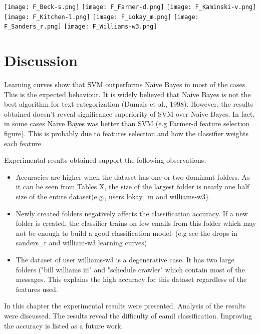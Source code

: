 \texttt{[image: F\_Beck-s.png]}
\texttt{[image: F\_Farmer-d.png]}
\texttt{[image: F\_Kaminski-v.png]}
\texttt{[image: F\_Kitchen-l.png]}
\texttt{[image: F\_Lokay\_m.png]}
\texttt{[image: F\_Sanders\_r.png]}
\texttt{[image: F\_Williams-w3.png]}

\section{Discussion}
Learning curves show that SVM outperforms Naive Bayes in most of the cases. This is the expected behaviour. It is widely believed that Naive Bayes is not the best algorithm for text categorization (Dumais et al., 1998). %
However, the results obtained doesn't reveal significance superiority of SVM over Naive Bayes. In fact, in some cases Naive Bayes was better than SVM (e.g Farmer-d feature selection figure). This is probably due to features selection and how the classifier weights each feature.


Experimental results obtained support the following observations:
\begin{itemize}
\item Accuracies are higher when the dataset has one or two dominant folders. As it can be seen from Tables X,%
 the size of the largest folder is nearly one half size of the entire dataset(e.g., users lokay\_m and williams-w3).

\item Newly created folders negatively affects the classification accuracy. If a new folder is created, the classifier trains on few emails from this folder which may not be enough to build a good classification model. (e.g see the drops in sanders\_r and william-w3 learning curves)

\item The dataset of user williams-w3 is a degenerative case. It has two large folders ("bill williams iii" and "schedule crawler" which contain most of the messages. This explains the high accuracy for this dataset regardless of the features used.
\end{itemize}

In this chapter the experimental results were presented. Analysis of the results were discussed. The results reveal the difficulty of eamil classification. Improving the accuracy is listed as a future work.

